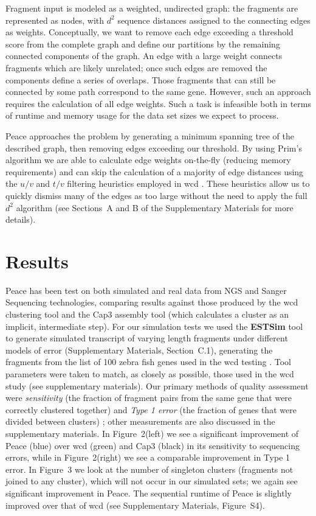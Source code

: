 \documentclass[a4,center,fleqn]{NAR}
\begin{document}
Fragment input is modeled as a weighted, undirected graph: the fragments
are represented as nodes, with $d^2$ sequence distances assigned to
the connecting edges as weights.  Conceptually, we want to remove each
edge exceeding a threshold score from the complete graph and define
our partitions by the remaining connected components of the graph.  An
edge with a large weight connects fragments which are likely unrelated;
once such edges are removed the components define a series of
overlaps.  Those fragments that can still be connected by some path
correspond to the same gene.  However, such an approach requires the
calculation of all edge weights.  Such a task is infeasible both in terms of
runtime and memory usage for the data set sizes we expect to process.

{\sc Peace} approaches the problem by generating a minimum spanning tree of the
described graph, then removing edges exceeding our threshold.  By
using Prim's algorithm we are able to calculate edge weights
on-the-fly (reducing memory requirements) and can skip the
calculation of a majority of edge distances using the $u/v$ and $t/v$
filtering heuristics employed in {\sc wcd} \cite{Hazelhurst08a}.
These heuristics allow us to quickly dismiss many of the edges as too
large without the need to apply the full $d^2$ algorithm (see
Sections~A and B of the Supplementary Materials for more details). 

\section{Results}

{\sc Peace} has been test on both simulated and real data from NGS and
Sanger Sequencing technologies, comparing results against those
produced by the {\sc wcd} clustering tool \cite{Hazelhurst08a} and the
{\sc Cap3} assembly tool \cite{Huang99} (which calculates a cluster as
an implicit, intermediate step).  For our simulation tests we used the
{\bf ESTSim} tool \cite{Hazelhurst03} to generate simulated transcript
of varying length fragments under different models of error
(Supplementary Materials, Section~C.1), generating the fragments from
the list of 100 zebra fish genes used in the {\sc wcd} testing
\cite{Hazelhurst08a}.  Tool parameters were taken to match, as closely
as possible, those used in the {\sc wcd} study (see supplementary
materials).  Our primary methods of quality assessment were {\it
  sensitivity} (the fraction of fragment pairs from the same gene that
were correctly clustered together) and {\it Type 1 error} (the
fraction of genes that were divided between clusters)
\cite{Wang04,Hazelhurst08a}; other measurements are also discussed in
the supplementary materials.  In Figure~2(left) we see a significant
improvement of {\sc Peace} (blue) over {\sc wcd} (green) and {\sc
  Cap3} (black) in its sensitivity to sequencing errors, while in
Figure~2(right) we see a comparable improvement in Type 1 error.  In
Figure~3 we look at the number of singleton clusters (fragments not
joined to any cluster), which will not occur in our simulated sets; we
again see significant improvement in {\sc Peace}.  The sequential
runtime of {\sc Peace} is slightly improved over that of {\sc wcd}
(see Supplementary Materials, Figure~S4).
\end{document}
